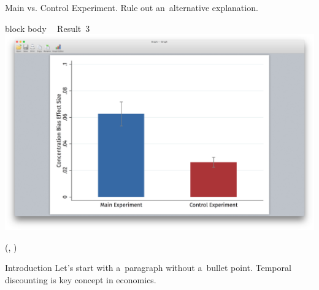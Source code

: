 \documentclass{beamer}
\newlength{\blockThree}
\begin{document}
\begin{frame}[t]
\begin{textblock*}{\colwidth}
\begin{alertblock}{
	\begin{minipage}[b]{53pt}
		\RaggedRight
		\noindent\hspace{-7pt}
	\end{minipage}
	\begin{minipage}[b]{\colwidth-145pt}
		Main vs. Control Experiment.\;
		{\mdseries Rule out an~alternative explanation.}
	\end{minipage}
}
\begin{beamercolorbox}[ht=8.0in, center]{block body}
	\Large\textcolor{SpotColor}{\textbf{~} \hspace{0.5in} {\firasemibold\small Result~3}} \\[15pt]
	\includegraphics[width=9.13in, trim={3.75in 1.75in 3.75in 2in}, clip]
		{1_Example_Content/Images/average_main_control.png} \\[59pt]
\end{beamercolorbox}
\end{alertblock}

\end{textblock*}


\TPshowboxesfalse




\begin{textblock*}{\colwidth}(\leftmargin, \blockThree)

\begin{parblock}{Introduction}
Let's start with a~paragraph without a~bullet point. Temporal discounting is key concept in economics.


\end{parblock}
\end{textblock*}
\end{frame}
\end{document}
